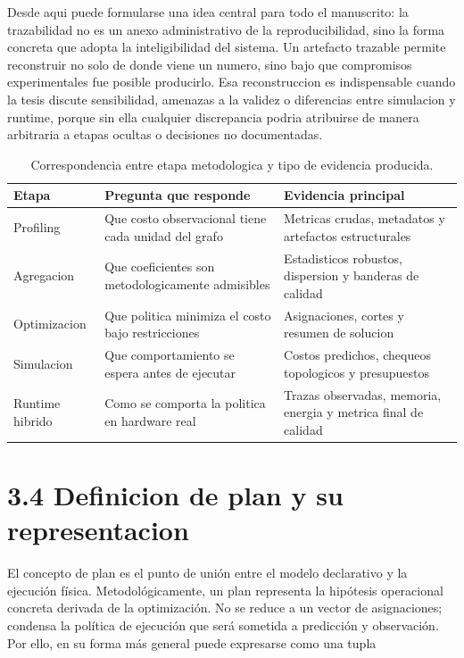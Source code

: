 Desde aqui puede formularse una idea central para todo el manuscrito: la trazabilidad no es un anexo administrativo de la reproducibilidad, sino la forma concreta que adopta la inteligibilidad del sistema. Un artefacto trazable permite reconstruir no solo de donde viene un numero, sino bajo que compromisos experimentales fue posible producirlo. Esa reconstruccion es indispensable cuando la tesis discute sensibilidad, amenazas a la validez o diferencias entre simulacion y runtime, porque sin ella cualquier discrepancia podria atribuirse de manera arbitraria a etapas ocultas o decisiones no documentadas.

\begin{table}[t]
\centering
\caption{Correspondencia entre etapa metodologica y tipo de evidencia producida.}
\label{tab:stage-evidence}
\small
\begin{tabularx}{\textwidth}{lXX}
\toprule
Etapa & Pregunta que responde & Evidencia principal \\
\midrule
Profiling & Que costo observacional tiene cada unidad del grafo & Metricas crudas, metadatos y artefactos estructurales \\
Agregacion & Que coeficientes son metodologicamente admisibles & Estadisticos robustos, dispersion y banderas de calidad \\
Optimizacion & Que politica minimiza el costo bajo restricciones & Asignaciones, cortes y resumen de solucion \\
Simulacion & Que comportamiento se espera antes de ejecutar & Costos predichos, chequeos topologicos y presupuestos \\
Runtime hibrido & Como se comporta la politica en hardware real & Trazas observadas, memoria, energia y metrica final de calidad \\
\bottomrule
\end{tabularx}
\normalsize
\end{table}

\section{3.4 Definicion de plan y su representacion}
El concepto de plan es el punto de unión entre el modelo declarativo y la ejecución física. Metodológicamente, un plan representa la hipótesis operacional concreta derivada de la optimización. No se reduce a un vector de asignaciones; condensa la política de ejecución que será sometida a predicción y observación. Por ello, en su forma más general puede expresarse como una tupla

